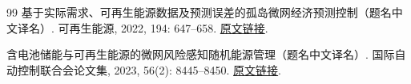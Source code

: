 \documentclass[UTF8,a4paper,12pt,fontset=fandol]{ctexart}
\numberwithin{equation}{section}
\begin{document}



\clearpage
\begin{thebibliography}{99}
基于实际需求、可再生能源数据及预测误差的孤岛微网经济预测控制（题名中文译名）.
可再生能源, 2022, 194: 647--658.
\href{https://doi.org/10.1016/j.renene.2022.05.103}{原文链接}.

含电池储能与可再生能源的微网风险感知随机能源管理（题名中文译名）.
国际自动控制联合会论文集, 2023, 56(2): 8445--8450.
\href{https://doi.org/10.1016/j.ifacol.2023.10.1042}{原文链接}.
\end{thebibliography}
\end{document}
